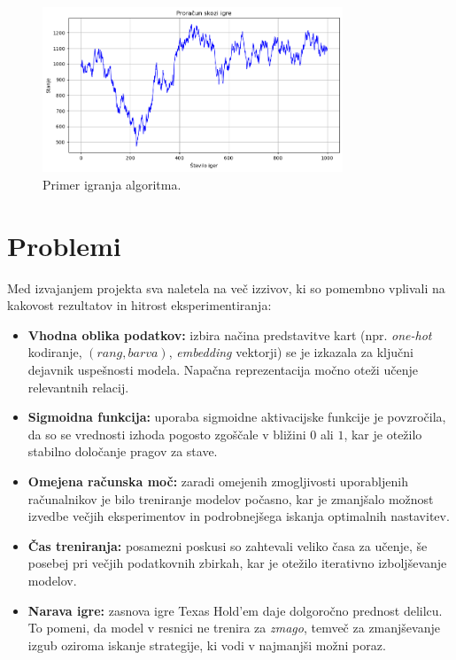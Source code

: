\documentclass[a4paper,12pt]{article}
\begin{document}
\begin{figure}[h!]
    \centering
    \includegraphics[width=0.8\textwidth]{gibanje.png}
    \caption{Primer igranja algoritma.}
    \label{fig:gib}
\end{figure}


\section{Problemi}

Med izvajanjem projekta sva naletela na več izzivov, ki so pomembno vplivali na kakovost rezultatov in hitrost eksperimentiranja:

\begin{itemize}
    \item \textbf{Vhodna oblika podatkov:} izbira načina predstavitve kart (npr. \textit{one-hot} kodiranje, $(rang, barva)$, 
    \textit{embedding} vektorji) se je izkazala za ključni dejavnik uspešnosti modela. Napačna reprezentacija 
    močno oteži učenje relevantnih relacij.
    
    \item \textbf{Sigmoidna funkcija:} uporaba sigmoidne aktivacijske funkcije je povzročila, da so se vrednosti izhoda 
    pogosto zgoščale v bližini $0$ ali $1$, kar je otežilo stabilno določanje pragov za stave.
    
    \item \textbf{Omejena računska moč:} zaradi omejenih zmogljivosti uporabljenih računalnikov je bilo treniranje 
    modelov počasno, kar je zmanjšalo možnost izvedbe večjih eksperimentov in podrobnejšega iskanja optimalnih nastavitev.
    
    \item \textbf{Čas treniranja:} posamezni poskusi so zahtevali veliko časa za učenje, še posebej pri večjih podatkovnih 
    zbirkah, kar je otežilo iterativno izboljševanje modelov.
    
    \item \textbf{Narava igre:} zasnova igre Texas Hold'em daje dolgoročno prednost delilcu. 
    To pomeni, da model v resnici ne trenira za \emph{zmago}, temveč za zmanjševanje izgub oziroma iskanje 
    strategije, ki vodi v najmanjši možni poraz.
\end{itemize}
\end{document}
